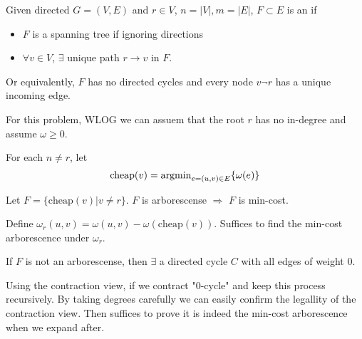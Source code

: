 
\begin{definition}
    Given directed  $ G=(V,E)  $ and  $ r\in V  $,  $ n=|V|,m=|E| $,  $ F\subset E $ is an  if 
    \begin{itemize}
        \item  $ F $ is a spanning tree if ignoring directions
        \item   $ \forall v\in V $,  $ \exists $ unique  path  $ r\rightarrow v $ in  $ F $.    
    \end{itemize}  
    Or equivalently,  $ F $ has no directed cycles and every node  $ v\neg r $ has a unique incoming edge.  
\end{definition}

For this problem, WLOG we can assuem that the root  $ r $  has no in-degree and assume  $ \omega \geq 0 $.  

\newcommand{\cheap}{\mathrm{cheap}}
For each  $ n\neq r $, let 
\[\mathrm{cheap}(v)=\operatorname{argmin}_{e=(u,v)\in E}\{\omega(e)\}\] 
\begin{claim}
    Let  $ F=\{\cheap(v)|v\neq r\} $.  $ F $ is arborescense $ \Rightarrow  $  $ F $ is min-cost.   
\end{claim}

Define  $ \omega_r(u,v)=\omega(u,v)-\omega(\cheap(v)) $. Suffices to find the min-cost arborescence under  $ \omega_r $. 

If  $ F $ is not an arborescense, then  $ \exists $ a directed cycle  $ C $ with all edges of weight  $ 0 $.    


Using the contraction view, if we contract "$ 0 $-cycle" and keep this process recursively. By taking degrees carefully we can easily confirm the legallity of the contraction view. Then suffices to prove it is indeed the min-cost arborescence when we expand after.

